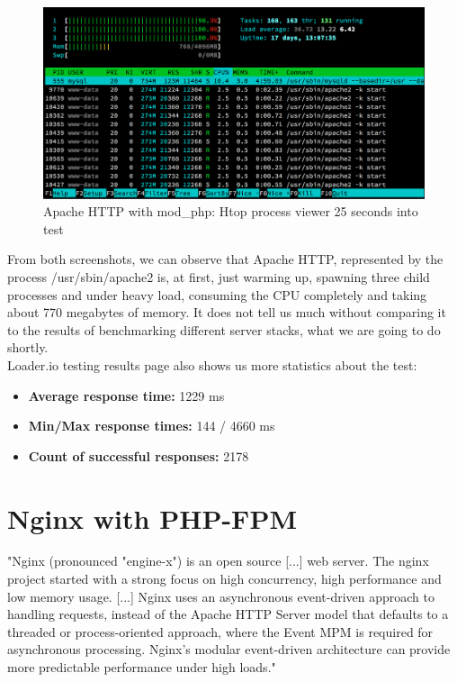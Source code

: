 \begin{figure}[H]
\begin{center}
\includegraphics[scale=0.5]{figures/Apache_mod_php_25s.png}
\caption{Apache HTTP with mod\_php: Htop process viewer 25 seconds into test}
\label{fig:apache_mod_php_25s}
\end{center}
\end{figure}

From both screenshots, we can observe that Apache HTTP, represented by the process /usr/sbin/apache2 is, at first, just warming up, spawning three child processes and under heavy load, consuming the CPU completely and taking about 770 megabytes of memory. It does not tell us much without comparing it to the results of benchmarking different server stacks, what we are going to do shortly. \\

Loader.io testing results page \cite{Loader.io:apache_mod_php} also shows us more statistics about the test:

\begin{itemize}
	\item\textbf{Average response time:} 1229 ms
	\item\textbf{Min/Max response times:} 144 / 4660 ms
	\item\textbf{Count of successful responses:} 2178
\end{itemize}

\section{Nginx with PHP-FPM}

"Nginx (pronounced "engine-x") is an open source [...] web server. The nginx project started with a strong focus on high concurrency, high performance and low memory usage. [...] Nginx uses an asynchronous event-driven approach to handling requests, instead of the Apache HTTP Server model that defaults to a threaded or process-oriented approach, where the Event MPM is required for asynchronous processing. Nginx's modular event-driven architecture can provide more predictable performance under high loads." \cite{Nginx:Wiki} \\

